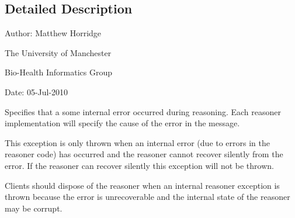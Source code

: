 \subsection{Detailed Description}
Author\-: Matthew Horridge\par
 The University of Manchester\par
 Bio-\/\-Health Informatics Group\par
 Date\-: 05-\/\-Jul-\/2010 

Specifies that a some internal error occurred during reasoning. Each reasoner implementation will specify the cause of the error in the message. 

This exception is only thrown when an internal error (due to errors in the reasoner code) has occurred and the reasoner cannot recover silently from the error. If the reasoner can recover silently this exception will not be thrown. 

Clients should dispose of the reasoner when an internal reasoner exception is thrown because the error is unrecoverable and the internal state of the reasoner may be corrupt. 

